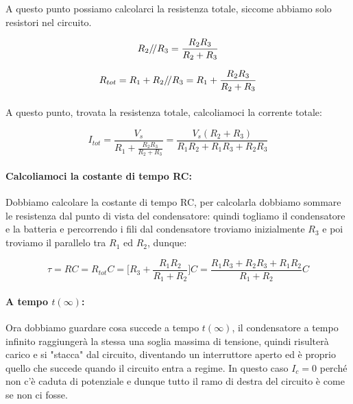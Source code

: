 A questo punto possiamo calcolarci la resistenza totale, siccome abbiamo solo resistori nel circuito.

\begin{equation*}
    R_2/\!/ R_3  =\frac{R_2R_3}{R_2 + R_3}
\end{equation*}

\begin{equation}
    R_{tot} = R_1 + R_2/\!/ R_3  = R_1 + \frac{R_2R_3}{R_2 + R_3}
\end{equation}

\paragraph{}
A questo punto, trovata la resistenza totale, calcoliamoci la corrente totale:

\begin{equation}
    I_{tot} = \frac{V_s}{R_1 + \frac{R_2R_3}{R_2 + R_3}} = \frac{V_s(R_2+R_3)}{R_1R_2 + R_1R_3+R_2R_3}
\end{equation}

\paragraph{Calcoliamoci la costante di tempo RC:}
Dobbiamo calcolare la costante di tempo RC, per calcolarla dobbiamo sommare le resistenza dal punto di vista del condensatore: quindi togliamo il condensatore e la batteria e percorrendo i fili dal condensatore troviamo inizialmente $R_3$ e poi troviamo il parallelo tra $R_1$ ed $R_2$, dunque:

\begin{equation}
    \tau = RC = R_{tot} C = \biggl[R_3 + \frac{R_1R_2}{R_1 + R_2}\biggl]C = \frac{R_1R_3 + R_2R_3 + R_1R_2}{R_1 + R_2}C
\end{equation}

\paragraph{A tempo $t(\infty)$:\\}

Ora dobbiamo guardare cosa succede a tempo $t(\infty)$, il condensatore a tempo infinito raggiungerà la stessa una soglia massima di tensione, quindi risulterà carico e si "stacca" dal circuito, diventando un interruttore aperto ed è proprio quello che succede quando il circuito entra a regime. In questo caso $I_c = 0$ perché non c'è caduta di potenziale e dunque tutto il ramo di destra del circuito è come se non ci fosse.

